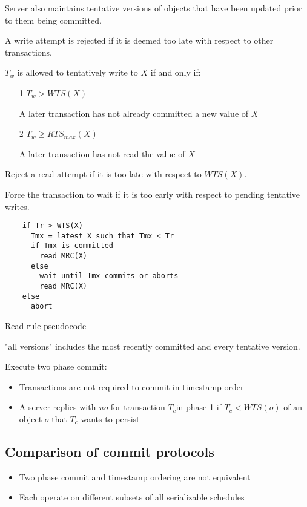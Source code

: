 \documentclass[a4paper]{article}
\begin{document}
Server also maintains tentative versions of objects that have been updated prior
to them being committed.


A write attempt is rejected if it is deemed too late with respect to other
transactions.

$T_{w}$ is allowed to tentatively write to $X$ if and only if:

\begin{enumerate}
  \item[1]
    $T_{w} > WTS(X)$

    A later transaction has not already committed a new value of $X$

  \item[2]
    $T_{w} \geq RTS_{max}(X)$

    A later transaction has not read the value of $X$
\end{enumerate}


Reject a read attempt if it is too late with respect to $WTS(X)$.

Force the transaction to wait if it is too early with respect to pending
tentative writes.

\begin{listing}[h]
  \begin{verbatim}
    if Tr > WTS(X)
      Tmx = latest X such that Tmx < Tr
      if Tmx is committed
        read MRC(X)
      else
        wait until Tmx commits or aborts
        read MRC(X)
    else
      abort
  \end{verbatim}
  \caption{Read rule pseudocode}
  \label{listing:read_rule_pseudocode}
\end{listing}

"all versions" includes the most recently committed and every tentative version.


Execute two phase commit:

\begin{itemize}
  \item Transactions are not required to commit in timestamp order
  \item A server replies with \textit{no} for transaction $T_{c} $in phase 1 if
        $T_{c} < WTS(o)$ of an object $o$ that $T_{c}$ wants to persist
\end{itemize}

\subsection{Comparison of commit protocols}

\begin{itemize}
  \item Two phase commit and timestamp ordering are not equivalent
  \item Each operate on different subsets of all serializable schedules
\end{itemize}
\end{document}
